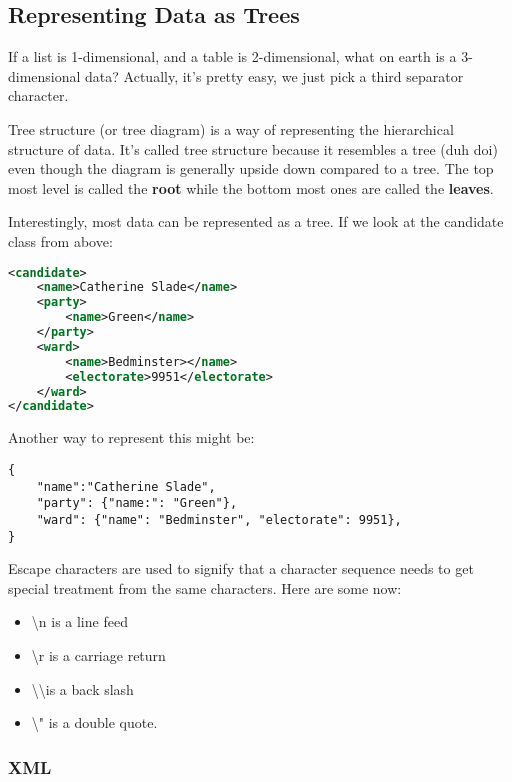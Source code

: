 \documentclass[11pt,a4paper,titlepage,dvipsnames,cmyk]{scrartcl}
\begin{document}
\subsection{Representing Data as Trees}%
\label{sub:tree-data}
If a list is 1-dimensional, and a table is 2-dimensional, what on earth is
a 3-dimensional data? Actually, it's pretty easy, we just pick a third
separator character.

Tree structure (or tree diagram) is a way of representing the hierarchical
structure of data. It's called tree structure because it resembles a tree
(duh doi) even though the diagram is generally upside down compared to a
tree. The top most level is called the \textbf{root} while the bottom most
ones are called the \textbf{leaves}.

Interestingly, most data can be represented as a tree. If we look at the
candidate class from above:

\begin{lstlisting}[language=XML]
<candidate>
    <name>Catherine Slade</name>
    <party>
        <name>Green</name>
    </party>
    <ward>
        <name>Bedminster></name>
        <electorate>9951</electorate>
    </ward>
</candidate>
\end{lstlisting}

Another way to represent this might be:

\begin{lstlisting}[]
{
    "name":"Catherine Slade",
    "party": {"name:": "Green"},
    "ward": {"name": "Bedminster", "electorate": 9951},
}
\end{lstlisting}

Escape characters are used to signify that a character sequence needs to
get special treatment from the same characters. Here are some now:

\begin{itemize}
    \item \textbackslash n is a line feed
    \item \textbackslash r is a carriage return
    \item \textbackslash \textbackslash \text{ }is a back slash
    \item \textbackslash " is a double quote.
\end{itemize}

\subsubsection{XML}%
\label{ssub:XML}
\end{document}
